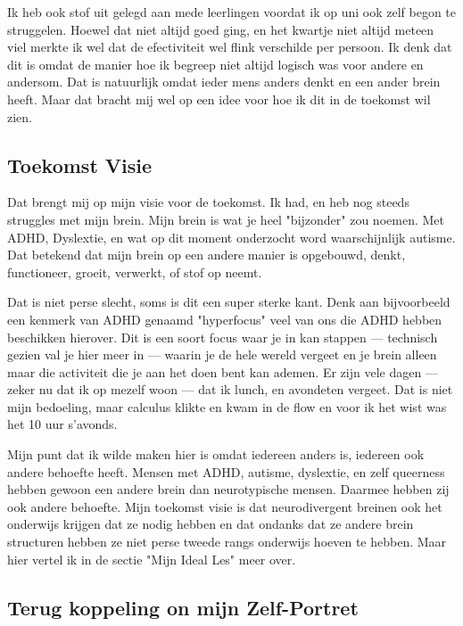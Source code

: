 \documentclass{article}
\begin{document}
                Ik heb ook stof uit gelegd aan mede leerlingen voordat ik op uni ook zelf begon te struggelen. Hoewel dat niet altijd goed ging, en het kwartje niet altijd meteen viel merkte ik wel dat de efectiviteit wel flink verschilde per persoon. Ik denk dat dit is omdat de manier hoe ik begreep niet altijd logisch was voor andere en andersom. Dat is natuurlijk omdat ieder mens anders denkt en een ander brein heeft. Maar dat bracht mij wel op een idee voor hoe ik dit in de toekomst wil zien.

        \subsection{Toekomst Visie}

            Dat brengt mij op mijn visie voor de toekomst. Ik had, en heb nog steeds struggles met mijn brein. Mijn brein is wat je heel "bijzonder" zou noemen. Met ADHD, Dyslextie, en wat op dit moment onderzocht word waarschijnlijk autisme. Dat betekend dat mijn brein op een andere manier is opgebouwd, denkt, functioneer, groeit, verwerkt, of stof op neemt\cite{neurodivergent}. 
            
            Dat is niet perse slecht, soms is dit een super sterke kant. Denk aan bijvoorbeeld een kenmerk van ADHD genaamd "hyperfocus"\cite{hyperfocus} veel van ons die ADHD hebben beschikken hierover. Dit is een soort focus waar je in kan stappen — technisch gezien val je hier meer in — waarin je de hele wereld vergeet en je brein alleen maar die activiteit die je aan het doen bent kan ademen. Er zijn vele dagen — zeker nu dat ik op mezelf woon — dat ik lunch, en avondeten vergeet. Dat is niet mijn bedoeling, maar calculus klikte en kwam in de flow en voor ik het wist was het 10 uur s'avonds.
            
            Mijn punt dat ik wilde maken hier is omdat iedereen anders is, iedereen ook andere behoefte heeft. Mensen met ADHD, autisme, dyslextie, en zelf queerness hebben gewoon een andere brein dan neurotypische mensen\cite{ADHD-Neurobiologie}\cite{Autisme}\cite{Dyslextie-breinen}\cite{LGBT-vs-CISHET-breinen}. Daarmee hebben zij ook andere behoefte\cite{ADHD-Bijkomende-problematiek}\cite{ADHD-behoeftes}. Mijn toekomst visie is dat neurodivergent breinen ook het onderwijs krijgen dat ze nodig hebben en dat ondanks dat ze andere brein structuren hebben ze niet perse tweede rangs onderwijs hoeven te hebben. Maar hier vertel ik in de sectie "Mijn Ideal Les" meer over.

        \subsection{Terug koppeling on mijn Zelf-Portret}
\end{document}
